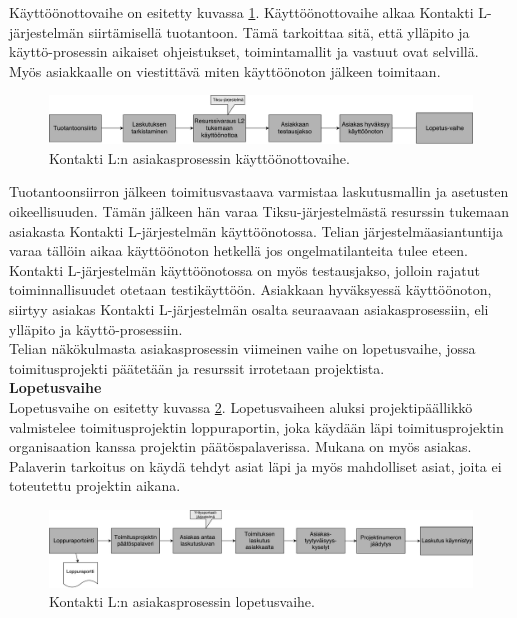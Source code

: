 \documentclass[finnish,12pt,a4paper,pdftex]{article}
\begin{document}

Käyttöönottovaihe on esitetty kuvassa \ref{fig:kayttoonotto}. Käyttöönottovaihe alkaa Kontakti L-järjestelmän siirtämisellä tuotantoon. Tämä tarkoittaa sitä, että ylläpito ja käyttö-prosessin aikaiset ohjeistukset, toimintamallit ja vastuut ovat selvillä. Myös asiakkaalle on viestittävä miten käyttöönoton jälkeen toimitaan. 

\begin{figure}[!h]
    \centering
    \includegraphics[scale=0.3]{images/kayttoonotto.pdf}
    \caption{Kontakti L:n asiakasprosessin käyttöönottovaihe.}
    \label{fig:kayttoonotto}
\end{figure}

Tuotantoonsiirron jälkeen toimitusvastaava varmistaa laskutusmallin ja asetusten oikeellisuuden. Tämän jälkeen hän varaa Tiksu-järjestelmästä resurssin tukemaan asiakasta Kontakti L-järjestelmän käyttöönotossa. Telian järjestelmäasiantuntija varaa tällöin aikaa käyttöönoton hetkellä jos ongelmatilanteita tulee eteen. Kontakti L-järjestelmän käyttöönotossa on myös testausjakso, jolloin rajatut toiminnallisuudet otetaan testikäyttöön. Asiakkaan hyväksyessä käyttöönoton, siirtyy asiakas Kontakti L-järjestelmän osalta seuraavaan asiakasprosessiin, eli ylläpito ja käyttö-prosessiin.\\

Telian näkökulmasta asiakasprosessin viimeinen vaihe on lopetusvaihe, jossa toimitusprojekti päätetään ja resurssit irrotetaan projektista. \\

\textbf{Lopetusvaihe}\\

Lopetusvaihe on esitetty kuvassa  \ref{fig:lopetus}. Lopetusvaiheen aluksi projektipäällikkö valmistelee toimitusprojektin loppuraportin, joka käydään läpi toimitusprojektin organisaation kanssa projektin päätöspalaverissa. Mukana on myös asiakas. Palaverin tarkoitus on käydä tehdyt asiat läpi ja myös mahdolliset asiat, joita ei toteutettu projektin aikana.\\

\begin{figure}[!h]
    \centering
    \includegraphics[scale=0.3]{images/lopetus.pdf}
    \caption{Kontakti L:n asiakasprosessin lopetusvaihe.}
    \label{fig:lopetus}
\end{figure}
\end{document}
